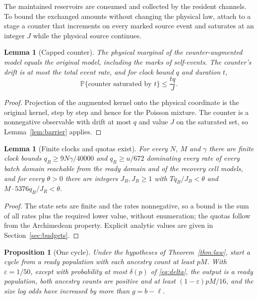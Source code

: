 \documentclass[11pt,a4paper]{article}
\theoremstyle{plain}
\newtheorem{proposition}[theorem]{Proposition}
\newtheorem{lemma}[theorem]{Lemma}
\theoremstyle{definition}
\theoremstyle{remark}
\newcommand{\Prob}{\mathbb P}
\newcommand{\eps}{\varepsilon}
\begin{document}
The maintained reservoirs are consumed and collected by the resident channels. To bound the exchanged amounts without changing the physical law, attach to a stage a counter that increments on every marked source event and saturates at an integer $J$ while the physical source continues.

\begin{lemma}[Capped counter]\label{lem:counter}
The physical marginal of the counter-augmented model equals the original model, including the marks of self-events. The counter's drift is at most the total event rate, and for clock bound $q$ and duration $t$,
\begin{equation}\label{eq:quota}
\Prob\{\text{counter saturated by }t\}\le\frac{tq}J .
\end{equation}
\end{lemma}

\begin{proof}
Projection of the augmented kernel onto the physical coordinate is the original kernel, step by step and hence for the Poisson mixture. The counter is a nonnegative observable with drift at most $q$ and value $J$ on the saturated set, so Lemma~\ref{lem:barrier} applies.
\end{proof}

\begin{lemma}[Finite clocks and quotas exist]\label{lem:quotas}
For every $N$, $M$ and $\gamma$ there are finite clock bounds $q_B\ge9N\gamma/40000$ and $q_R\ge u/672$ dominating every rate of every batch domain reachable from the ready domain and of the recovery cell models, and for every $\theta>0$ there are integers $J_B,J_R\ge1$ with $Tq_B/J_B<\theta$ and $M\cdot5376q_R/J_R<\theta$.
\end{lemma}

\begin{proof}
The state sets are finite and the rates nonnegative, so a bound is the sum of all rates plus the required lower value, without enumeration; the quotas follow from the Archimedean property. Explicit analytic values are given in Section~\ref{sec:budgets}.
\end{proof}

\begin{proposition}[One cycle]\label{prop:cycle}
Under the hypotheses of Theorem~\ref{thm:law}, start a cycle from a ready population with each ancestry count at least $pM$. With $\eps=1/50$, except with probability at most $\delta(p)$ of \eqref{eq:delta}, the output is a ready population, both ancestry counts are positive and at least $(1-\eps)pM/16$, and the size log odds have increased by more than $g=b-\ell$.
\end{proposition}
\end{document}
